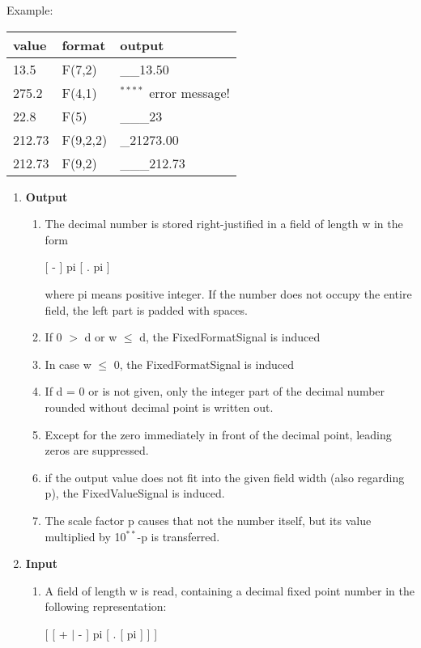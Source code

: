 \begin{removed}
Example:

\begin{tabular}{lll}
value  & format   & output \\ \hline
13.5   & F(7,2)   & \_\_13.50  \\
275.2  & F(4,1)   & $^{****}$ \x \x error message! \\
22.8   & F(5)     & \_\_\_23 \\
212.73 & F(9,2,2) & \_21273.00 \\
212.73 & F(9,2)   & \_\_\_212.73
\end{tabular}
\end{removed}

\begin{added}
\begin{enumerate}
\item {\bf Output}
\begin{enumerate}
\item The decimal number is stored right-justified in a field of length
w in the form

[ - ] pi [ . pi ]

where pi means positive integer. If the number does not occupy the
entire field, the left part is padded with spaces.
\item If 0 $>$ d or w $\leq$ d, the FixedFormatSignal is induced
\item In case w $\leq$ 0, the FixedFormatSignal is induced
\item If d = 0 or is not given, only the integer part of the decimal
number rounded without decimal point is written out.
\item Except for the zero immediately in front of the decimal point,
leading zeros are suppressed.
\item if the output value does not fit into the given field width 
   (also regarding p), the FixedValueSignal is induced.
\item The scale factor p causes that not the number itself, but its
value multiplied by 10$^{**}$-p is transferred.
\end{enumerate}
\item {\bf Input}
\begin{enumerate}
\item A field of length w is read, containing a decimal fixed point
number in the following representation:

[ [ + $\mid$ - ] pi [ . [ pi ] ] ]


\end{enumerate}
\end{enumerate}
\end{added}
